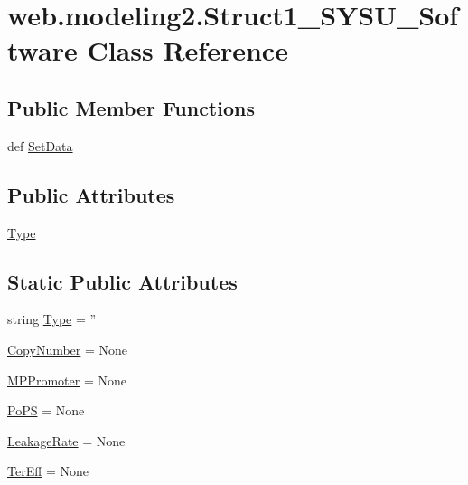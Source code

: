 \hypertarget{classweb_1_1modeling2_1_1_struct1___s_y_s_u___software}{\section{web.\-modeling2.\-Struct1\-\_\-\-S\-Y\-S\-U\-\_\-\-Software Class Reference}
\label{classweb_1_1modeling2_1_1_struct1___s_y_s_u___software}
}
\subsection*{Public Member Functions}
\begin{DoxyCompactItemize}
\item 
def \hyperlink{classweb_1_1modeling2_1_1_struct1___s_y_s_u___software_ad73c4d66769931536fac69216ec80cb7}{Set\-Data}
\end{DoxyCompactItemize}
\subsection*{Public Attributes}
\begin{DoxyCompactItemize}
\item 
\hyperlink{classweb_1_1modeling2_1_1_struct1___s_y_s_u___software_a46261ffd06b8aad29514e2080dd98af3}{Type}
\end{DoxyCompactItemize}
\subsection*{Static Public Attributes}
\begin{DoxyCompactItemize}
\item 
string \hyperlink{classweb_1_1modeling2_1_1_struct1___s_y_s_u___software_a643acda63b29b5ed546a59e374a32065}{Type} = ''
\item 
\hyperlink{classweb_1_1modeling2_1_1_struct1___s_y_s_u___software_a81368e00274e99774546312f7aaa0571}{Copy\-Number} = None
\item 
\hyperlink{classweb_1_1modeling2_1_1_struct1___s_y_s_u___software_a1927cf67abf9b144099d98c96f698454}{M\-P\-Promoter} = None
\item 
\hyperlink{classweb_1_1modeling2_1_1_struct1___s_y_s_u___software_a7479145ae80d7882e3c5774cfcc2a11d}{Po\-P\-S} = None
\item 
\hyperlink{classweb_1_1modeling2_1_1_struct1___s_y_s_u___software_a0ce92919deee9513fd0818f7fc1d6c03}{Leakage\-Rate} = None
\item 
\hyperlink{classweb_1_1modeling2_1_1_struct1___s_y_s_u___software_aecfcb5540c96bf298317d5b06bbd775c}{Ter\-Eff} = None
\end{DoxyCompactItemize}


